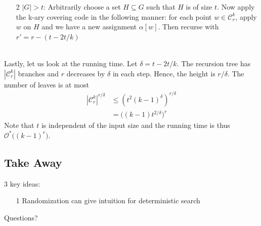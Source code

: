 \documentclass[pdf] {beamer}
\newcommand{\cc}{\mathcal{C}}
\renewcommand{\O}{\mathcal{O}^*}
\begin{document}
	\begin{frame}
		\begin{enumerate}
			\item[2] $|G| > t$: Arbitrarily choose a set $H \subseteq G$ such that $H$ is of size $t$. Now apply the k-ary covering code in the following manner: for each point $w \in \cc_r^k$, apply $w$ on $H$ and we have a new assignment $\alpha[w]$. Then recurse with $r' = r - (t - 2t/k)$\\~\
		\end{enumerate}
	\end{frame}	
	\begin{frame}
		Lastly, let us look at the running time. Let $\delta = t - 2t/k$. The recursion tree has $|\cc_r^k|$ branches and $r$ decreases by $\delta$ in each step. Hence, the height is ${r/\delta}$. The number of leaves is at most
		\begin{align*}
		|\mathcal{C}_r^k|^{r/\delta} &\leq (t^{2}(k-1)^{\delta})^{r/\delta}\\
		&= \big((k-1)t^{2/\delta}\big)^{r}
		\end{align*}
		Note that $t$ is independent of the input size and the running time is thus $\O\big((k-1)^r\big)$.
	\end{frame}

\subsection{Take Away}
\begin{frame}
	3 key ideas:
	\begin{enumerate}
		\item[1] Randomization can give intuition for deterministic search
	\end{enumerate}
\end{frame}
	\begin{frame}
Questions?
\end{frame}
\end{document}
